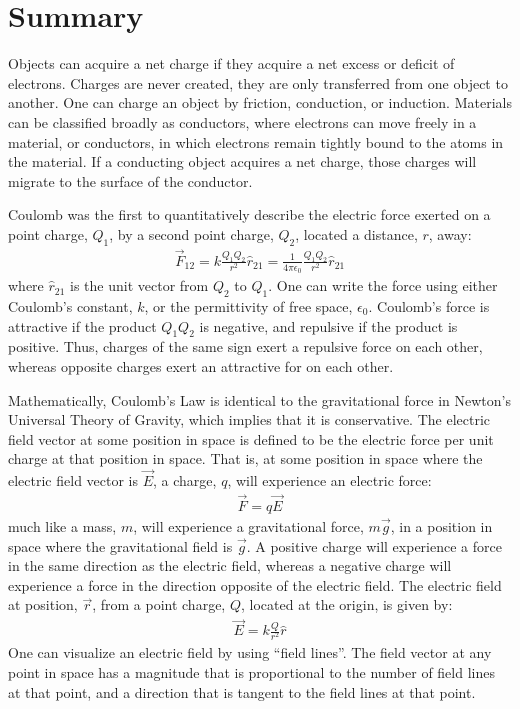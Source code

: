 \section{Summary}

\begin{chapterSummary}
Objects can acquire a net charge if they acquire a net excess or deficit of electrons. Charges are never created, they are only transferred from one object to another. One can charge an object by friction, conduction, or induction. Materials can be classified broadly as conductors, where electrons can move freely in a material, or conductors, in which electrons remain tightly bound to the atoms in the material. If a conducting object acquires a net charge, those charges will migrate to the surface of the conductor.

Coulomb was the first to quantitatively describe the electric force exerted on a point charge, $Q_1$, by a second point charge, $Q_2$, located a distance, $r$, away:
\begin{align*}
\vec F_{12}=k\frac{Q_1Q_2}{r^2}\hat r_{21}=\frac{1}{4\pi\epsilon_0}\frac{Q_1Q_2}{r^2}\hat r_{21}
\end{align*}
where $\hat r_{21}$ is the unit vector from  $Q_2$ to $Q_1$. One can write the force using either Coulomb's constant, $k$, or the permittivity of free space, $\epsilon_0$. Coulomb's force is attractive if the product $Q_1Q_2$ is negative, and repulsive if the product is positive. Thus, charges of the same sign exert a repulsive force on each other, whereas opposite charges exert an attractive for on each other. 

Mathematically, Coulomb's Law is identical to the gravitational force in Newton's Universal Theory of Gravity, which implies that it is conservative. The electric field vector at some position in space is defined to be the electric force per unit charge at that position in space. That is, at some position in space where the electric field vector is $\vec E$, a charge, $q$, will experience an electric force:
\begin{align*}
\vec F=q\vec E
\end{align*} 
much like a mass, $m$, will experience a gravitational force, $m\vec g$, in a position in space where the gravitational field is $\vec g$. A positive charge will experience a force in the same direction as the electric field, whereas a negative charge will experience a force in the direction opposite of the electric field. The electric field at position, $\vec r$, from a point charge, $Q$, located at the origin, is given by:
\begin{align*}
\vec E = k\frac{Q}{r^2}\hat r
\end{align*}
One can visualize an electric field by using ``field lines''. The field vector at any point in space has a magnitude that is proportional to the number of field lines at that point, and a direction that is tangent to the field lines at that point.


\end{chapterSummary}
